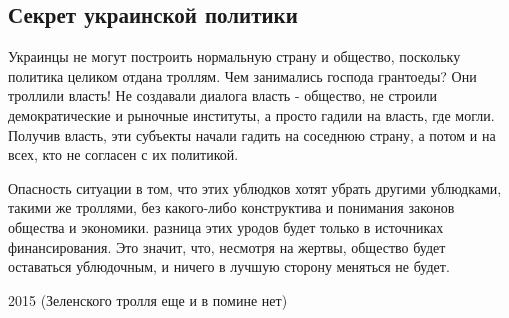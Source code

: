  
 
 
 
 

\subsection{Секрет украинской политики}

Украинцы не могут построить нормальную страну и общество, поскольку политика
целиком отдана троллям. Чем занимались господа грантоеды? Они троллили власть!
Не создавали диалога власть - общество, не строили демократические и рыночные
институты, а просто гадили на власть, где могли. Получив власть, эти субъекты
начали гадить на соседнюю страну, а потом и на всех, кто не согласен с их
политикой. 

Опасность ситуации в том, что этих ублюдков хотят убрать другими ублюдками,
такими же троллями, без какого-либо конструктива и понимания законов общества и
экономики. разница этих уродов будет только в источниках финансирования. Это
значит, что, несмотря на жертвы, общество будет оставаться ублюдочным, и ничего
в лучшую сторону меняться не будет.

2015 (Зеленского тролля еще и в помине нет)
